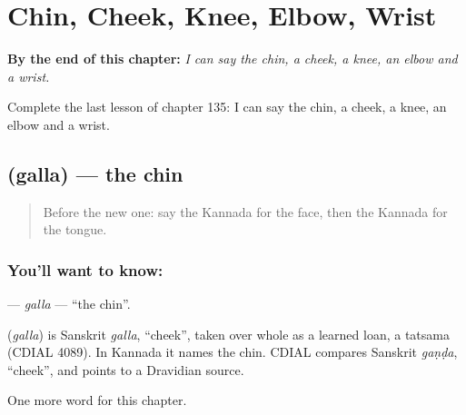 
\chapter{Chin, Cheek, Knee, Elbow, Wrist}
\label{ch:ka-chin-cheek-knee-elbow-wrist}

\begin{chapteropening}
\textbf{By the end of this chapter:} \emph{I can say the chin, a cheek, a knee, an elbow and a wrist.}

Complete the last lesson of chapter 135: I can say the chin, a cheek, a knee, an elbow and a wrist.
\end{chapteropening}

\section[\texorpdfstring{\kn{ಗಲ್ಲ} (galla)}{ಗಲ್ಲ (galla)}]{ (galla) — the chin}

\label{lesson:KA-C135-galla}



\begin{quote}
Before the new one: say the Kannada for the face, then the Kannada for the tongue.
\end{quote}

\subsection*{You'll want to know: }
\textbf{} — \emph{galla} — \textquotedblleft{}the chin\textquotedblright{}.

\begin{cousinweb}
\textbf{} (\emph{galla}) is Sanskrit \emph{galla}, \textquotedblleft{}cheek\textquotedblright{}, taken over whole as a learned loan, a tatsama (CDIAL 4089). In Kannada it names the chin. CDIAL compares Sanskrit \emph{gaṇḍa}, \textquotedblleft{}cheek\textquotedblright{}, and points to a Dravidian source.
\end{cousinweb}

\begin{grammarlens}[title={What you've built}]
One more word for this chapter.
\end{grammarlens}

